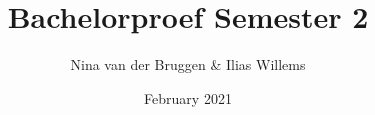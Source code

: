 \documentclass{article}
\title{Bachelorproef Semester 2}
\author{Nina van der Bruggen \& Ilias Willems}
\date{February 2021}
\begin{document}
\maketitle

\tableofcontents

\newpage



\newpage

\newpage

\newpage

\newpage

\newpage







\footnotesize{
    
}
\end{document}
